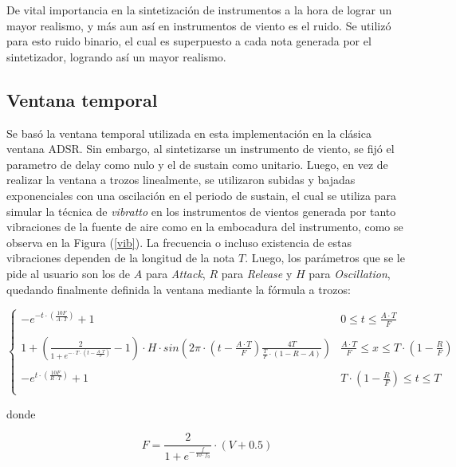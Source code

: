 De vital importancia en la sintetización de instrumentos a la hora de lograr un mayor realismo, y más aun así en instrumentos de viento es el ruido. Se utilizó para esto ruido binario, el cual es superpuesto a cada nota generada por el sintetizador, logrando así un mayor realismo.

\subsection{Ventana temporal}

Se basó la ventana temporal utilizada en esta implementación en la clásica ventana ADSR. Sin embargo, al sintetizarse un instrumento de viento, se fijó el parametro de delay como nulo y el de sustain como unitario. Luego, en vez de realizar la ventana a trozos linealmente, se utilizaron subidas y bajadas exponenciales con una oscilación en el periodo de sustain, el cual se utiliza para simular la técnica de \textit{vibratto} en los instrumentos de vientos generada por tanto vibraciones de la fuente de aire como en la embocadura del instrumento, como se observa en la Figura (\ref{vib}). La frecuencia o incluso existencia de estas vibraciones dependen de la longitud de la nota $T$. Luego, los parámetros que se le pide al usuario son los de $A$ para \textit{Attack}, $R$ para \textit{Release} y $H$ para \textit{Oscillation}, quedando finalmente definida la ventana mediante la fórmula a trozos:

\begin{equation}
   \left\{
\begin{array}{ll}
      -e^{-t \cdot \left( \frac{10F}{A\cdot T} \right) } + 1 & 0\leq t \leq \frac{A \cdot T}{F} \\
      \\
      1 + \left( \frac{2}{1 + e ^{-\cdot T \cdot \left( t - \frac{A \cdot T}{F} \right) }} - 1 \right) \cdot H \cdot sin\left( 2\pi \cdot \left( t - \frac{A \cdot T}{F} \right) \frac{4T}{\frac{T}{F} \cdot \left( 1 - R - A \right)} \right) & \frac{A \cdot T}{F} \leq x \leq T\cdot (1-\frac{R}{F}) \\
      \\
      -e^{t \cdot \left( \frac{10F}{R\cdot T} \right) } + 1 & T\cdot (1-\frac{R}{F}) \leq t \leq T \\
\end{array} 
\right. 
\end{equation}

donde

\begin{equation}
F = \frac{2}{1 + e^{-\frac{f}{10\cdot f_0}}} \cdot \left( V + 0.5 \right)
\end{equation}

